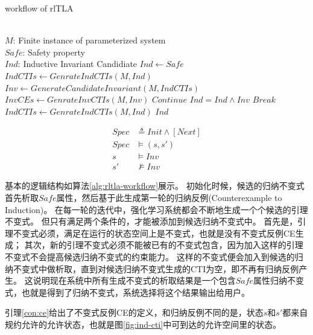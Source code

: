 \begin{algorithm}[ht]
    \caption[short]{workflow of rlTLA}
    \label{alg:rltla-workflow}
    
    \begin{algorithmic}[1]
        \REQUIRE \ \\
        $M$: Finite instance of parameterized system\\
        $Safe$: Safety property
		\ENSURE \ \\
        $Ind$: Inductive Invariant Candidiate
		\STATE $Ind \gets Safe$
        \STATE $IndCTIs \gets GenrateIndCTIs(M, Ind)$
                \STATE $Inv \gets GenerateCandidateInvariant(M, IndCTIs)$
                \STATE $InvCEs \gets GenrateInvCTIs(M, Inv)$
                    \STATE $Continue$
                \ENDIF
                    \STATE $Ind = Ind \wedge Inv$
                    \STATE $Break$
                \ENDIF
            \ENDWHILE
            \STATE $IndCTIs \gets GenrateIndCTIs(M, Ind)$
        \ENDWHILE
        \RETURN $Ind$
    \end{algorithmic}
\end{algorithm}

\begin{align}
    Spec &\triangleq Init \wedge [Next] \\
	Spec &\vDash (s, s') \label{con:ce} \\ 
	s &\vDash  Inv \\
	s' &\nvDash  Inv 
\end{align}

基本的逻辑结构如算法\ref{alg:rltla-workflow}展示。
初始化时候，候选的归纳不变式首先析取$Safe$属性，然后基于此生成第一轮的归纳反例(Counterexample to Induction)。
在每一轮的迭代中，强化学习系统都会不断地生成一个个候选的引理不变式。
但只有满足两个条件的，才能被添加到候选归纳不变式中。
首先是，引理不变式必须，满足在运行的状态空间上是不变式，也就是没有不变式反例CE生成；
其次，新的引理不变式必须不能被已有的不变式包含，因为加入这样的引理不变式不会提高候选归纳不变式的约束能力。
这样的不变式便会加入到候选的归纳不变式中做析取，直到对候选归纳不变式生成的CTI为空，即不再有归纳反例产生。
这说明现在系统中所有生成不变式的析取结果是一个包含$Safe$属性归纳不变式，也就是得到了归纳不变式，系统选择将这个结果输出给用户。

引理\ref{con:ce}给出了不变式反例CE的定义，和归纳反例不同的是，状态$s$和$s'$都来自规约允许的允许状态，也就是图\ref{fig:ind-cti}中可到达的允许空间里的状态。

